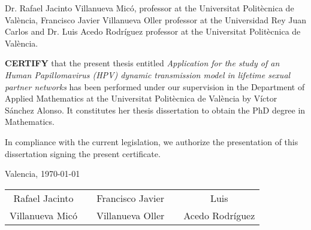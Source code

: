 
\vspace{3cm}
Dr. Rafael Jacinto Villanueva Mic\'{o}, professor at the Universitat Polit\`{e}c\-ni\-ca de Val\`{e}ncia, Francisco Javier Villanueva Oller professor at the Universidad Rey Juan Carlos and Dr. Luis Acedo Rodr\'{i}guez professor at the Universitat Polit\`{e}c\-ni\-ca de Val\`{e}ncia.
\vspace{1.5cm}

\textbf{CERTIFY} that the present thesis entitled \textit{Application for the study of an Human Papillomavirus (HPV) dynamic transmission model in lifetime sexual partner networks} has been performed under our supervision in the Department of Applied Mathematics at the Universitat Polit\`{e}cnica de Val\`{e}ncia by V\'{i}ctor S\'{a}nchez Alonso. It constitutes her thesis dissertation to obtain the PhD degree in Mathematics.

In compliance with the current legislation, we authorize the presentation of this dissertation signing the present certificate.

\vspace{1.5cm}

\begin{center}
Valencia, \today
\end{center}

\vspace{5cm}

\begin{center}
\begin{tabular}{ccccc}
Rafael Jacinto	& \hspace{1.4cm} &  Francisco Javier & \hspace{1.4cm} & Luis \\
Villanueva Mic\'{o}	& \hspace{1.4cm} &  Villanueva Oller	& \hspace{1.4cm} & Acedo Rodr\'{i}guez
\end{tabular} 
\end{center}

